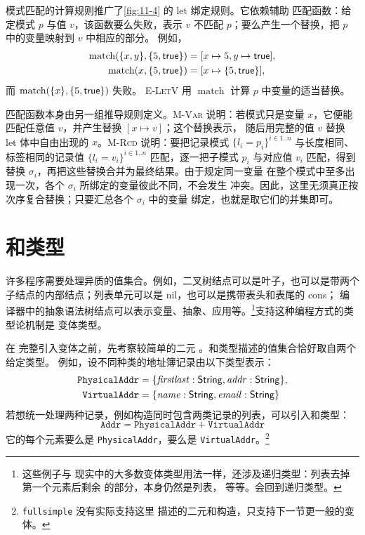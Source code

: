 模式匹配的计算规则推广了\cref{fig:11-4} 的 let 绑定规则。它依赖辅助
匹配函数：给定模式 \(p\) 与值 \(v\)，该函数要么失败，表示 \(v\) 不匹配
\(p\)；要么产生一个替换，把 \(p\) 中的变量映射到 \(v\) 中相应的部分。
例如，
\[
\begin{aligned}
\operatorname{match}(\{x,y\},\{5,\mathsf{true}\})
  &=[x\mapsto5,y\mapsto\mathsf{true}],\\
\operatorname{match}(x,\{5,\mathsf{true}\})
  &=[x\mapsto\{5,\mathsf{true}\}],
\end{aligned}
\]
而 \(\operatorname{match}(\{x\},\{5,\mathsf{true}\})\) 失败。
\textsc{E-LetV} 用 \(\operatorname{match}\) 计算 \(p\) 中变量的适当替换。

匹配函数本身由另一组推导规则定义。\textsc{M-Var} 说明：若模式只是变量
\(x\)，它便能匹配任意值 \(v\)，并产生替换 \([x\mapsto v]\)；这个替换表示，
随后用完整的值 \(v\) 替换 let 体中自由出现的 \(x\)。\textsc{M-Rcd} 说明：要把记录模式
\(\{l_i=p_i\}^{i\in1..n}\) 与长度相同、标签相同的记录值
\(\{l_i=v_i\}^{i\in1..n}\) 匹配，逐一把子模式 \(p_i\) 与对应值 \(v_i\)
匹配，得到替换 \(\sigma_i\)，再把这些替换合并为最终结果。由于规定同一变量
在整个模式中至多出现一次，各个 \(\sigma_i\) 所绑定的变量彼此不同，不会发生
冲突。因此，这里无须真正按次序复合替换；只要汇总各个 \(\sigma_i\) 中的变量
绑定，也就是取它们的并集即可。


\section{和类型}
\label{sec:11.9}

许多程序需要处理异质的值集合。例如，二叉树结点可以是叶子，也可以是带两个
子结点的内部结点；列表单元可以是 nil，也可以是携带表头和表尾的 cons；
编译器中的抽象语法树结点可以表示变量、抽象、应用等。\footnote{这些例子与
现实中的大多数变体类型用法一样，还涉及递归类型：列表去掉第一个元素后剩余
的部分，本身仍然是列表，
等等。会回到递归类型。}支持这种编程方式的类型论机制是
变体类型。

在  完整引入变体之前，先考察较简单的二元
。和类型描述的值集合恰好取自两个给定类型。
例如，设不同种类的地址簿记录由以下类型表示：
\[
\begin{aligned}
\texttt{PhysicalAddr}
 &=\{\mathit{firstlast}:\mathsf{String},
      \mathit{addr}:\mathsf{String}\},\\
\texttt{VirtualAddr}
 &=\{\mathit{name}:\mathsf{String},
      \mathit{email}:\mathsf{String}\}
\end{aligned}
\]
若想统一处理两种记录，例如构造同时包含两类记录的列表，可以引入和类型：
\[
\texttt{Addr}=\texttt{PhysicalAddr}+\texttt{VirtualAddr}
\]
它的每个元素要么是 \texttt{PhysicalAddr}，要么是
\texttt{VirtualAddr}。\footnote{\texttt{fullsimple} 没有实际支持这里
描述的二元和构造，只支持下一节更一般的变体。}


